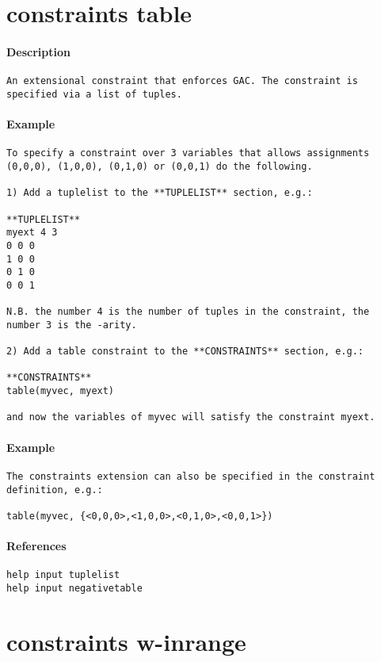 \section{constraints table}
\paragraph{Description}
{\footnotesize
\begin{verbatim}
An extensional constraint that enforces GAC. The constraint is
specified via a list of tuples.
\end{verbatim}
}
\paragraph{Example}
{\footnotesize
\begin{verbatim}
To specify a constraint over 3 variables that allows assignments
(0,0,0), (1,0,0), (0,1,0) or (0,0,1) do the following.

1) Add a tuplelist to the **TUPLELIST** section, e.g.:

**TUPLELIST**
myext 4 3
0 0 0
1 0 0
0 1 0
0 0 1

N.B. the number 4 is the number of tuples in the constraint, the 
number 3 is the -arity.

2) Add a table constraint to the **CONSTRAINTS** section, e.g.:

**CONSTRAINTS**
table(myvec, myext)

and now the variables of myvec will satisfy the constraint myext.
\end{verbatim}
}
\paragraph{Example}
{\footnotesize
\begin{verbatim}
The constraints extension can also be specified in the constraint
definition, e.g.:

table(myvec, {<0,0,0>,<1,0,0>,<0,1,0>,<0,0,1>})
\end{verbatim}
}
\paragraph{References}
{\footnotesize
\begin{verbatim}
help input tuplelist
help input negativetable
\end{verbatim}
}
\section{constraints w-inrange}
